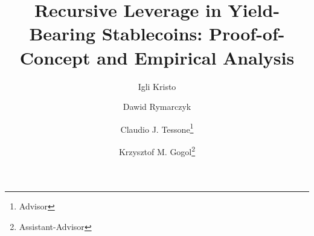 \documentclass[runningheads]{llncs}
\renewcommand{\_}{\origunderscore\allowbreak}
\begin{document}
\title{Recursive Leverage in Yield-Bearing Stablecoins: Proof-of-Concept and Empirical Analysis}


\author{Igli Kristo \and
Dawid Rymarczyk \and
Claudio J. Tessone\thanks{Advisor} \and
Krzysztof M. Gogol\thanks{Assistant-Advisor}}


\maketitle              %
%
\begin{abstract}
    
\end{abstract}













\appendix



\end{document}
